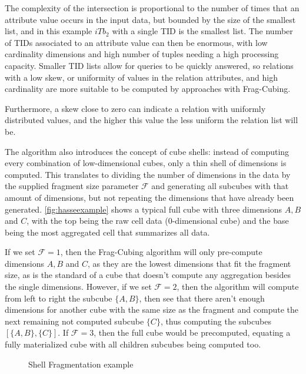 
The complexity of the intersection is proportional to the number of times that an attribute value occurs in the input data, but bounded by the size of the smallest list, and in this example $iTb_2$ with a single TID is the smallest list.
The number of TIDs associated to an attribute value can then be enormous, with low cardinality dimensions and high number of tuples needing a high processing capacity.
Smaller TID lists allow for queries to be quickly answered, so relations with a low skew, or uniformity of values in the relation attributes, and high cardinality are more suitable to be computed by approaches with Frag-Cubing.

Furthermore, a skew close to zero can indicate a relation with uniformly distributed values, and the higher this value the less uniform the relation list will be.

The algorithm also introduces the concept of cube shells: instead of computing every combination of low-dimensional cubes, only a thin shell of dimensions is computed.
This translates to dividing the number of dimensions in the data by the supplied fragment size parameter $\mathcal{F}$ and generating all subcubes with that amount of dimensions, but not repeating the dimensions that have already been generated.
\autoref{fig:hasseexample} shows a typical full cube with three dimensions $A, B$ and $C$, with the top being the raw cell data ($0$-dimensional cube) and the base being the most aggregated cell that summarizes all data.

If we set $\mathcal{F} = 1$, then the Frag-Cubing algorithm will only pre-compute dimensions $A, B$ and $C$, as they are the lowest dimensions that fit the fragment size, as is the standard of a cube that doesn't compute any aggregation besides the single dimensions.
However, if we set $\mathcal{F} = 2$, then the algorithm will compute from left to right the subcube $\{A, B\}$, then see that there aren't enough dimensions for another cube with the same size as the fragment and compute the next remaining not computed subcube $\{C\}$, thus computing the subcubes $[\{A, B\}, \{C\}]$.
If $\mathcal{F} = 3$, then the full cube would be precomputed, equating a fully materialized cube with all children subcubes being computed too.

\begin{figure}[!htb]
  \caption{Shell Fragmentation example}\label{fig:hasseexample}
  \vspace{2mm}
  \begin{center}
  \end{center}
  \vspace{1mm}
  \legenda{}
\end{figure}

